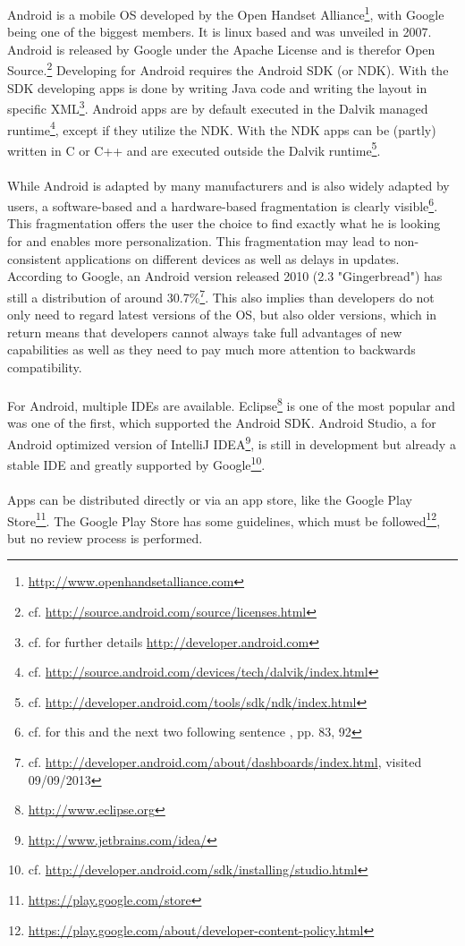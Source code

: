 \vspace{0.75em}
Android is a mobile OS developed by the Open Handset Alliance\footnote{\url{http://www.openhandsetalliance.com}}, with Google being one of the biggest members. It is linux based and was unveiled in 2007. Android is released by Google under the Apache License and is therefor Open Source.\footnote{cf. \url{http://source.android.com/source/licenses.html}} Developing for Android requires the Android SDK (or NDK). With the SDK developing apps is done by writing Java code and writing the layout in specific XML\footnote{cf. for further details \url{http://developer.android.com}}. Android apps are by default executed in the Dalvik managed runtime\footnote{cf. \url{http://source.android.com/devices/tech/dalvik/index.html}}, except if they utilize the NDK. With the NDK apps can be (partly) written in C or C++ and are executed outside the Dalvik runtime\footnote{cf. \url{http://developer.android.com/tools/sdk/ndk/index.html}}.
\\
\\
While Android is adapted by many manufacturers and is also widely adapted by users, a software-based and a hardware-based fragmentation is clearly visible\footnote{cf. for this and the next two following sentence \cite{DanHan.2012}, pp. 83, 92}. This fragmentation offers the user the choice to find exactly what he is looking for and enables more personalization. This fragmentation may lead to non-consistent applications on different devices as well as delays in updates. According to Google, an Android version released 2010 (2.3 "Gingerbread") has still a distribution of around 30.7\%\footnote{cf. \url{http://developer.android.com/about/dashboards/index.html}, visited 09/09/2013}. This also implies than developers do not only need to regard latest versions of the OS, but also older versions, which in return means that developers cannot always take full advantages of new capabilities as well as they need to pay much more attention to backwards compatibility.
\\
\\
For Android, multiple IDEs are available. Eclipse\footnote{\url{http://www.eclipse.org}} is one of the most popular and was one of the first, which supported the Android SDK. Android Studio, a for Android optimized version of IntelliJ IDEA\footnote{\url{http://www.jetbrains.com/idea/}}, is still in development but already a stable IDE and greatly supported by Google\footnote{cf. \url{http://developer.android.com/sdk/installing/studio.html}}.
\\
\\
Apps can be distributed directly or via an app store, like the Google Play Store\footnote{\url{https://play.google.com/store}}. The Google Play Store has some guidelines, which must be followed\footnote{\url{https://play.google.com/about/developer-content-policy.html}}, but no review process is performed.

